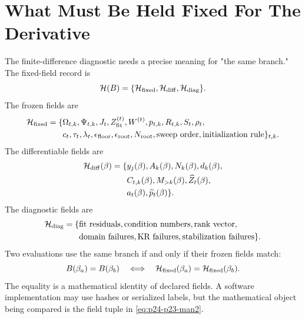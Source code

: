 \documentclass[11pt]{article}
\numberwithin{equation}{section}
\begin{document}
\section{What Must Be Held Fixed For The Derivative}

The finite-difference diagnostic needs a precise meaning for "the same
branch."  The fixed-field record is
\begin{equation}
    \mathcal H(B)
    =
    \{\mathcal H_{\rm fixed},\mathcal H_{\rm diff},\mathcal H_{\rm diag}\}.
    \label{eq:p24-p23-man1}
\end{equation}
The frozen fields are
\begin{equation}
\begin{aligned}
    \mathcal H_{\rm fixed}
    =
    \{&
    \Omega_{t,k},\Psi_{t,k},J_t,
    Z_{\rm fit}^{(t)},W^{(t)},p_{t,k},R_{t,k},
    S_t,\rho_t,\\
    &c_t,\tau_t,\lambda_t,\epsilon_{\rm floor},
    \epsilon_{\rm root},N_{\rm root},
    \text{sweep order},\text{initialization rule}\}_{t,k}.
\end{aligned}
    \label{eq:p24-p23-man2}
\end{equation}
The differentiable fields are
\begin{equation}
    \begin{aligned}
    \mathcal H_{\rm diff}(\beta)
    =
    \{&
    y_j(\beta),A_k(\beta),N_k(\beta),d_k(\beta),\\
    &C_{t,k}(\beta),M_{>k}(\beta),\widehat Z_t(\beta),\\
    &a_t(\beta),\widehat p_t(\beta)\}.
    \end{aligned}
    \label{eq:p24-p23-man3}
\end{equation}
The diagnostic fields are
\begin{equation}
    \begin{aligned}
    \mathcal H_{\rm diag}
    =
    \{&
    \text{fit residuals},\text{condition numbers},\text{rank vector},\\
    &\text{domain failures},\text{KR failures},
      \text{stabilization failures}\}.
    \end{aligned}
    \label{eq:p24-p23-man4}
\end{equation}
Two evaluations use the same branch if and only if their frozen fields match:
\begin{equation}
    B(\beta_a)=B(\beta_b)
    \quad\Longleftrightarrow\quad
    \mathcal H_{\rm fixed}(\beta_a)=\mathcal H_{\rm fixed}(\beta_b).
    \label{eq:p24-p23-man5}
\end{equation}
The equality is a mathematical identity of declared fields.  A software
implementation may use hashes or serialized labels, but the mathematical
object being compared is the field tuple in \eqref{eq:p24-p23-man2}.
\end{document}
